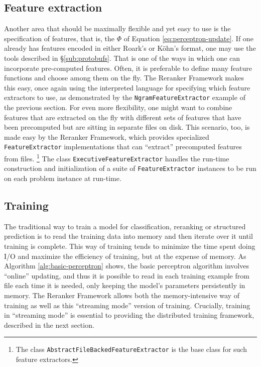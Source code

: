 \documentclass[a4paper]{article}
\begin{document}
\subsection{Feature extraction}

Another area that should be maximally flexible and yet easy to use
is the specification of features, that is, the $\Phi$ of Equation
\ref{eq:perceptron-update}. If one already has features encoded in
either Roark's or K\"{o}hn's format, one may use the tools described in
\S\ref{sub:protobufs}. That is one of the ways in which one can
incorporate pre-computed features. Often, it is preferable to define
many feature functions and choose among them on the fly. The Reranker
Framework makes this easy, once again using the interpreted language
for specifying which feature extractors to use, as demonstrated by
the \texttt{NgramFeatureExtractor} example of the previous section.
For even more flexibility, one might want to combine features that
are extracted on the fly with different sets of features that have
been precomputed but are sitting in separate files on disk. This scenario,
too, is made easy by the Reranker Framework, which provides specialized
\texttt{FeatureExtractor} implementations that can ``extract'' precomputed
features from files.%
\footnote{The class \texttt{AbstractFileBackedFeatureExtractor} is the base
class for such feature extractors.%
} The class \texttt{ExecutiveFeatureExtractor} handles the run-time
construction and initialization of a suite of \texttt{FeatureExtractor}\emph{
}instances to be run on each problem instance at run-time.


\subsection{Training}

The traditional way to train a model for classification, reranking
or structured prediction is to read the training data into memory
and then iterate over it until training is complete. This way of training
tends to minimize the time spent doing I/O and maximize the efficiency
of training, but at the expense of memory. As Algorithm \ref{alg:basic-perceptron}
shows, the basic perceptron algorithm involves ``online'' updating,
and thus it is possible to read in each training example from file
each time it is needed, only keeping the model's parameters persistently
in memory. The Reranker Framework allows both the memory-intensive
way of training as well as this ``streaming mode'' version of training.
Crucially, training in ``streaming mode'' is essential to providing
the distributed training framework, described in the next section.
\end{document}
